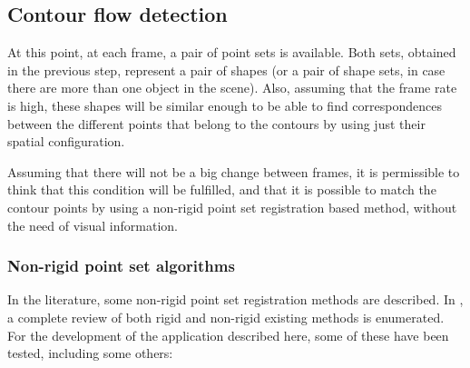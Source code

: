 \subsection{Contour flow detection}\label{ch:chapter02_01_02}

At this point, at each frame, a pair of point sets is available. Both sets, obtained in the previous step, represent a pair of shapes (or a pair of shape sets, in case there are more than one object in the scene). Also, assuming that the frame rate is high, these shapes will be similar enough to be able to find correspondences between the different points that belong to the contours by using just their spatial configuration. 

Assuming that there will not be a big change between frames, it is permissible to think that this condition will be fulfilled, and that it is possible to match the contour points by using a non-rigid point set registration based method, without the need of visual information.

\subsubsection{Non-rigid point set algorithms}\label{ch:chapter02_01_02_01}

In the literature, some non-rigid point set registration methods are described. In \cite{myronenko2010point}, a complete review of both rigid and non-rigid existing methods is enumerated. For the development of the application described here, some of these have been tested, including some others:

